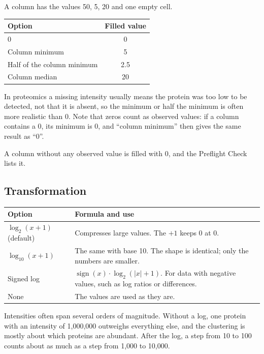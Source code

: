 \documentclass[11pt,a4paper]{article}
\begin{document}
\begin{example}
A column has the values 50, 5, 20 and one empty cell.

\begin{center}
\begin{tabular}{lc}
\toprule
Option & Filled value\\
\midrule
0 & 0\\
Column minimum & 5\\
Half of the column minimum & 2.5\\
Column median & 20\\
\bottomrule
\end{tabular}
\end{center}

In proteomics a missing intensity usually means the protein was too low to be detected, not that it is absent, so
the minimum or half the minimum is often more realistic than 0. Note that zeros count as observed values: if a
column contains a 0, its minimum is 0, and ``column minimum'' then gives the same result as ``0''.
\end{example}

A column without any observed value is filled with 0, and the Preflight Check lists it.

\subsection{Transformation}

\begin{center}
\begin{tabularx}{\textwidth}{lL}
\toprule
Option & Formula and use\\
\midrule
$\log_2(x+1)$ (default) & Compresses large values. The $+1$ keeps 0 at 0.\\
$\log_{10}(x+1)$ & The same with base 10. The shape is identical; only the numbers are smaller.\\
Signed log & $\operatorname{sign}(x)\cdot\log_2(|x|+1)$. For data with negative values, such as log ratios or
  differences.\\
None & The values are used as they are.\\
\bottomrule
\end{tabularx}
\end{center}

Intensities often span several orders of magnitude. Without a log, one protein with an intensity of 1{,}000{,}000
outweighs everything else, and the clustering is mostly about which proteins are abundant. After the log, a step
from 10 to 100 counts about as much as a step from 1{,}000 to 10{,}000.
\end{document}
